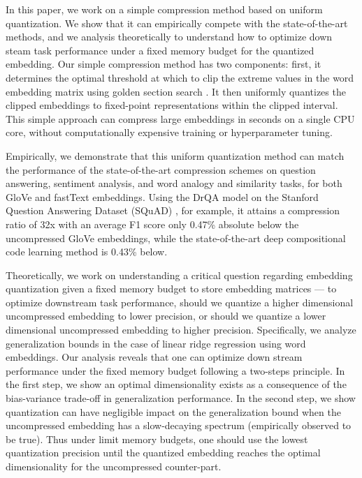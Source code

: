 In this paper, we work on a simple compression method based on uniform quantization. We show that it can empirically compete with the state-of-the-art methods, and we analysis theoretically to understand how to optimize down steam task performance under a fixed memory budget for the quantized embedding.
Our simple compression method has two components: first, it determines the optimal threshold at which to clip the extreme values in the word embedding matrix using golden section search \citep{golden53}.
It then uniformly quantizes the clipped embeddings to fixed-point representations within the clipped interval.
This simple approach can compress large embeddings in seconds on a single CPU core, without computationally expensive training or hyperparameter tuning.


Empirically, we demonstrate that this uniform quantization method can match the performance of the state-of-the-art compression schemes on question answering, sentiment analysis, and word analogy and similarity tasks, for both GloVe \citep{glove14} and fastText \citep{fasttext18} embeddings.
Using the DrQA model \citep{drqa17} on the Stanford Question Answering Dataset (SQuAD) \citep{squad16}, for example, it attains a compression ratio of 32x with an average F1 score only 0.47\% absolute below the uncompressed GloVe embeddings, while the state-of-the-art deep compositional code learning method \cite{dccl17} is 0.43\% below.

Theoretically, we work on understanding a critical question regarding embedding quantization given a fixed memory budget to store embedding matrices --- {to optimize downstream task performance, should we quantize a higher dimensional uncompressed embedding to lower precision, or should we quantize a lower dimensional uncompressed embedding to higher precision.} Specifically, we analyze generalization bounds in the case of linear ridge regression using word embeddings.
Our analysis reveals that one can optimize down stream performance under the fixed memory budget following a two-steps principle. In the first step, we show an optimal dimensionality exists as a consequence of the bias-variance trade-off in generalization performance. In the second step, we show quantization can have negligible impact on the generalization bound when the uncompressed embedding has a slow-decaying spectrum (empirically observed to be true). Thus under limit memory budgets, one should use the lowest quantization precision until the quantized embedding reaches the optimal dimensionality for the uncompressed counter-part. 



